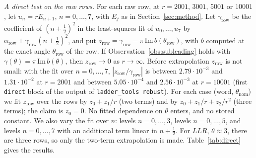 \documentclass[11pt]{amsart}
\theoremstyle{definition}
\theoremstyle{remark}
\begin{document}
\emph{A direct test on the raw rows.} For each raw row, at $r = 2001$, $3001$, $5001$
or $10001$, let $u_n = rE_{n+1}$, $n = 0, \dots, 7$, with $E_j$ as in
Section~\ref{sec:method}. Let $\gamma_{\mathrm{row}}$ be the coefficient of
$(n+\frac12)^2$ in the least-squares fit of $u_0, \dots, u_7$ by
$\alpha_{\mathrm{row}} + \gamma_{\mathrm{row}}(n+\frac12)^2$, and put
$z_{\mathrm{row}} = \gamma_{\mathrm{row}} - \pi\,\mathrm{Im}\,b(\theta_{\mathrm{row}})$,
with $b$ computed at the exact angle $\theta_{\mathrm{row}}$ of the row. If
Observation~\ref{obs:subleading} holds with $\gamma(\theta) =
\pi\,\mathrm{Im}\,b(\theta)$, then $z_{\mathrm{row}} \to 0$ as $r \to \infty$. Before
extrapolation $z_{\mathrm{row}}$ is not small: with the fit over $n = 0, \dots, 7$,
$|z_{\mathrm{row}}/\gamma_{\mathrm{row}}|$ is between $2.79\cdot10^{-3}$ and
$1.31\cdot10^{-2}$ at $r = 2001$ and between $5.05\cdot10^{-4}$ and
$2.56\cdot10^{-3}$ at $r = 10001$ (first \texttt{direct} block of the output of
\texttt{ladder\_tools robust}). For each case (word,
$\theta_{\mathrm{nom}}$) we fit $z_{\mathrm{row}}$ over the rows by $z_0 + z_1/r$ (two
terms) and by $z_0 + z_1/r + z_2/r^2$ (three terms); the claim is $z_0 = 0$. No fitted
dependence on $\theta$ enters, and no stored constant. We also vary the fit over $n$:
levels $n = 0, \dots, 3$, levels $n = 0, \dots, 5$, and levels $n = 0, \dots, 7$ with an
additional term linear in $n+\frac12$. For $LLR$, $\theta \approx 3$, there are three
rows, so only the two-term extrapolation is made. Table~\ref{tab:direct} gives the
results.
\end{document}
